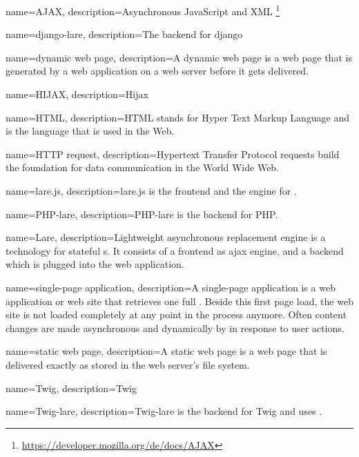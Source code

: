 \usepackage{glossaries}

{
  name=AJAX,
  description={Asynchronous JavaScript and XML \footnote{\url{https://developer.mozilla.org/de/docs/AJAX}}}
}

{
  name=django-lare,
  description={The \lare{} backend for django}
}

{
  name=dynamic web page,  
  description={A dynamic web page is a web page that is generated by a web application on a web server before it gets delivered.}
}

{
  name=HIJAX,
  description={Hijax}
}

{
  name=HTML,
  description={HTML stands for Hyper Text Markup Language and is the language that is used in the Web.}
}

{
  name=HTTP request,
  description={Hypertext Transfer Protocol requests build the foundation for data communication in the World Wide Web.}
}

{
  name=lare.js,
  description={lare.js is the \lare{} frontend and the \ajax{} engine for \lare{}.}
}

{
  name=PHP-lare,
  description={PHP-lare is the \lare{} backend for PHP.}
}

{
  name=Lare,
  description={Lightweight asynchronous replacement engine is a technology for stateful \singlePageApplication{}s.
  It consists of a \lare{} frontend as ajax engine, and a \lare{} backend which is plugged into the web application.}
}

{
  name=single-page application,
  description={A single-page application is a web application or web site that retrieves one full \webPage{}.
  Beside this first page load, the web site is not loaded completely at any point in the process anymore.
  Often content changes are made asynchronous and dynamically by \ajax{} in response to user actions.}
}

{
  name=static web page,
  description={A static web page is a web page that is delivered exactly as stored in the web server's file system.}
}

{
  name=Twig,
  description={Twig}
}

{
  name=Twig-lare,
  description={Twig-lare is the \lare{} backend for Twig and uses \phpLare{}.}
}

